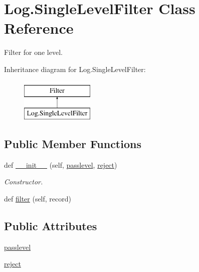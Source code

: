 \hypertarget{class_log_1_1_single_level_filter}{}\section{Log.\+Single\+Level\+Filter Class Reference}
\label{class_log_1_1_single_level_filter}


Filter for one level.  


Inheritance diagram for Log.\+Single\+Level\+Filter\+:\begin{figure}[H]
\begin{center}
\leavevmode
\includegraphics[height=2.000000cm]{class_log_1_1_single_level_filter}
\end{center}
\end{figure}
\subsection*{Public Member Functions}
\begin{DoxyCompactItemize}
\item 
def \hyperlink{class_log_1_1_single_level_filter_aeaf022ddb4e62a8147a1867399d5b6c7}{\+\_\+\+\_\+init\+\_\+\+\_\+} (self, \hyperlink{class_log_1_1_single_level_filter_abae072b8db802c0e4c4ab15823020916}{passlevel}, \hyperlink{class_log_1_1_single_level_filter_a4a0c91f813f78d0f28435283661c44c7}{reject})
\begin{DoxyCompactList}\small\item\em Constructor. \end{DoxyCompactList}\item 
def \hyperlink{class_log_1_1_single_level_filter_a0bf970b79dca04f61fe488eb0f8314ee}{filter} (self, record)
\end{DoxyCompactItemize}
\subsection*{Public Attributes}
\begin{DoxyCompactItemize}
\item 
\hyperlink{class_log_1_1_single_level_filter_abae072b8db802c0e4c4ab15823020916}{passlevel}
\item 
\hyperlink{class_log_1_1_single_level_filter_a4a0c91f813f78d0f28435283661c44c7}{reject}
\end{DoxyCompactItemize}


